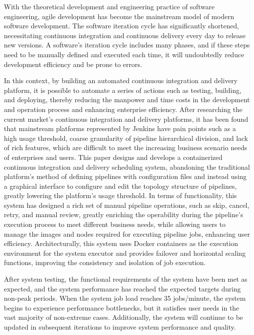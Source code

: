 \begin{abstract*}
  With the theoretical development and engineering practice of software engineering, agile development has become the mainstream model of modern software development. The software iteration cycle has significantly shortened, necessitating continuous integration and continuous delivery every day to release new versions. A software's iteration cycle includes many phases, and if these steps need to be manually defined and executed each time, it will undoubtedly reduce development efficiency and be prone to errors.

In this context, by building an automated continuous integration and delivery platform, it is possible to automate a series of actions such as testing, building, and deploying, thereby reducing the manpower and time costs in the development and operation process and enhancing enterprise efficiency. After researching the current market's continuous integration and delivery platforms, it has been found that mainstream platforms represented by Jenkins have pain points such as a high usage threshold, coarse granularity of pipeline hierarchical division, and lack of rich features, which are difficult to meet the increasing business scenario needs of enterprises and users. This paper designs and develops a containerized continuous integration and delivery scheduling system, abandoning the traditional platform's method of defining pipelines with configuration files and instead using a graphical interface to configure and edit the topology structure of pipelines, greatly lowering the platform's usage threshold. In terms of functionality, this system has designed a rich set of manual pipeline operations, such as skip, cancel, retry, and manual review, greatly enriching the operability during the pipeline's execution process to meet different business needs, while allowing users to manage the images and nodes required for executing pipeline jobs, enhancing user efficiency. Architecturally, this system uses Docker containers as the execution environment for the system executor and provides failover and horizontal scaling functions, improving the consistency and isolation of job execution.

After system testing, the functional requirements of the system have been met as expected, and the system performance has reached the expected targets during non-peak periods. When the system job load reaches 35 jobs/minute, the system begins to experience performance bottlenecks, but it satisfies user needs in the vast majority of non-extreme cases. Additionally, the system will continue to be updated in subsequent iterations to improve system performance and quality.
\end{abstract*}
